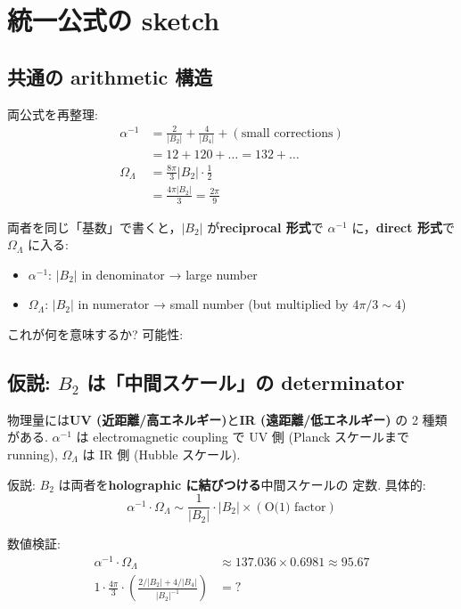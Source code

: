 \documentclass[11pt,a4paper]{article}
\begin{document}
\section{統一公式の sketch}

\subsection{共通の arithmetic 構造}

両公式を再整理:
\begin{align}
\alpha^{-1} &= \frac{2}{|B_2|} + \frac{4}{|B_4|} + (\text{small corrections})\\
&= 12 + 120 + \ldots = 132 + \ldots\\
\Omega_\Lambda &= \frac{8\pi}{3}|B_2|\cdot\frac{1}{2}\\
&= \frac{4\pi|B_2|}{3} = \frac{2\pi}{9}
\end{align}

両者を同じ「基数」で書くと，$|B_2|$ が\textbf{reciprocal 形式}で
$\alpha^{-1}$ に，\textbf{direct 形式}で $\Omega_\Lambda$ に入る:
\begin{itemize}
\item $\alpha^{-1}$: $|B_2|$ in denominator → large number
\item $\Omega_\Lambda$: $|B_2|$ in numerator → small number (but multiplied by $4\pi/3 \sim 4$)
\end{itemize}

これが何を意味するか? 可能性:

\subsection{仮説: $B_2$ は「中間スケール」の determinator}

物理量には\textbf{UV (近距離/高エネルギー)}と\textbf{IR (遠距離/低エネルギー)}
の 2 種類がある. $\alpha^{-1}$ は electromagnetic coupling で UV 側
(Planck スケールまで running), $\Omega_\Lambda$ は IR 側 (Hubble
スケール).

仮説: $B_2$ は両者を\textbf{holographic に結びつける}中間スケールの
定数. 具体的:
\begin{equation}
\alpha^{-1} \cdot \Omega_\Lambda \sim \frac{1}{|B_2|} \cdot |B_2| \times (\text{O(1) factor})
\end{equation}

数値検証:
\begin{align}
\alpha^{-1} \cdot \Omega_\Lambda &\approx 137.036 \times 0.6981 \approx 95.67\\
1 \cdot \frac{4\pi}{3} \cdot \left(\frac{2/|B_2| + 4/|B_4|}{|B_2|^{-1}}\right) &= ?
\end{align}
\end{document}
